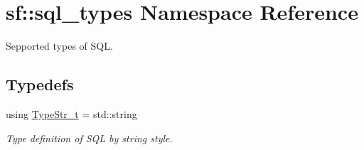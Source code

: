 \hypertarget{namespacesf_1_1sql__types}{}\section{sf\+:\+:sql\+\_\+types Namespace Reference}
\label{namespacesf_1_1sql__types}


Sepported types of S\+QL.  


\subsection*{Typedefs}
\begin{DoxyCompactItemize}
\item 
\mbox{\label{namespacesf_1_1sql__types_a1a4f114cdf79706d2298e3454006e65b}} 
using \hyperlink{namespacesf_1_1sql__types_a1a4f114cdf79706d2298e3454006e65b}{Type\+Str\+\_\+t} = std\+::string
\begin{DoxyCompactList}\small\item\em Type definition of S\+QL by string style. \end{DoxyCompactList}\end{DoxyCompactItemize}

